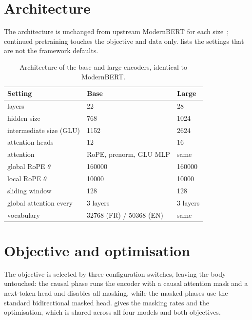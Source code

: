 \section{Architecture}

The architecture is unchanged from upstream ModernBERT for each
size~\citep{modernbert}; continued pretraining touches the objective and data only.
 lists the settings that are not the framework defaults.

\begin{table}[t]
  \centering
  \small
  \setlength{\tabcolsep}{12pt}
  \begin{tabular}{@{}lll@{}}
    \toprule
    Setting & Base & Large \\
    \midrule
    layers                 & 22 & 28 \\
    hidden size            & 768 & 1024 \\
    intermediate size (GLU) & 1152 & 2624 \\
    attention heads        & 12 & 16 \\
    attention              & RoPE, prenorm, GLU MLP & same \\
    global RoPE $\theta$   & 160000 & 160000 \\
    local RoPE $\theta$    & 10000 & 10000 \\
    sliding window         & 128 & 128 \\
    global attention every & 3 layers & 3 layers \\
    vocabulary             & 32768 (FR) / 50368 (EN) & same \\
    \bottomrule
  \end{tabular}
\caption{Architecture of the base and large encoders, identical to ModernBERT.}
\label{tab:clm-arch}
\end{table}

\section{Objective and optimisation}

The objective is selected by three configuration switches, leaving the body
untouched: the causal phase runs the encoder with a causal attention mask and a
next-token head and disables all masking, while the masked phases use the standard
bidirectional masked head.  gives the masking rates and
 the optimisation, which is shared across all four models and
both objectives.

